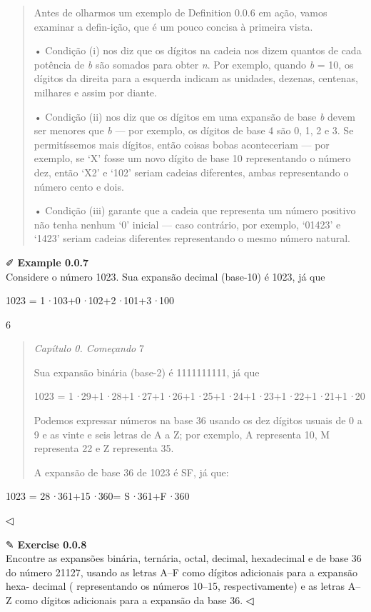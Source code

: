 \documentclass[
]{article}
\begin{document}
\begin{quote}
Antes de olharmos um exemplo de Definition 0.0.6 em ação, vamos examinar
a defin-ição, que é um pouco concisa à primeira vista.

• Condição (i) nos diz que os dígitos na cadeia nos dizem quantos de
cada potência de \emph{b} são somados para obter \emph{n}. Por exemplo,
quando \emph{b} = 10, os dígitos da direita para a esquerda indicam as
unidades, dezenas, centenas, milhares e assim por diante.

• Condição (ii) nos diz que os dígitos em uma expansão de base \emph{b}
devem ser menores que \emph{b} --- por exemplo, os dígitos de base 4 são
0, 1, 2 e 3. Se permitíssemos mais dígitos, então coisas bobas
aconteceriam --- por exemplo, se `X' fosse um novo dígito de base 10
representando o número dez, então `X2' e `102' seriam cadeias
diferentes, ambas representando o número cento e dois.

• Condição (iii) garante que a cadeia que representa um número positivo
não tenha nenhum `0' inicial --- caso contrário, por exemplo, `01423' e
`1423' seriam cadeias diferentes representando o mesmo número natural.
\end{quote}

✐ \textbf{Example 0.0.7}\\
Considere o número 1023. Sua expansão decimal (base-10) é 1023, já que

1023 = 1\emph{·}103+0\emph{·}102+2\emph{·}101+3\emph{·}100

6

\begin{quote}
\emph{Capítulo 0. Começando} 7

Sua expansão binária (base-2) é 1111111111, já que

1023 =
1\emph{·}29+1\emph{·}28+1\emph{·}27+1\emph{·}26+1\emph{·}25+1\emph{·}24+1\emph{·}23+1\emph{·}22+1\emph{·}21+1\emph{·}20

Podemos expressar números na base 36 usando os dez dígitos usuais de 0 a
9 e as vinte e seis letras de A a Z; por exemplo, A representa 10, M
representa 22 e Z representa 35.

A expansão de base 36 de 1023 é SF, já que:
\end{quote}

1023 = 28\emph{·}361+15\emph{·}360= S\emph{·}361+F\emph{·}360

◁

✎ \textbf{Exercise 0.0.8}\\
Encontre as expansões binária, ternária, octal, decimal, hexadecimal e
de base 36 do número 21127, usando as letras A--F como dígitos
adicionais para a expansão hexa- decimal ( representando os números
10--15, respectivamente) e as letras A--Z como dígitos adicionais para a
expansão da base 36. ◁
\end{document}
